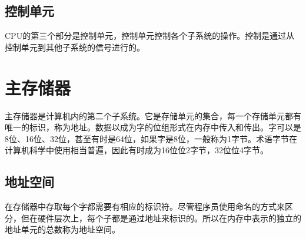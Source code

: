 \subsection{控制单元}
CPU的第三个部分是控制单元，控制单元控制各个子系统的操作。控制是通过从控制单元到其他子系统的信号进行的。
\section{主存储器}
主存储器是计算机内的第二个子系统。它是存储单元的集合，每一个存储单元都有唯一的标识，称为地址。数据以成为字的位组形式在内存中传入和传出。字可以是8位、16位、32位，甚至有时是64位，如果字是8位，一般称为1字节。术语字节在计算机科学中使用相当普遍，因此有时成为16位位2字节，32位位4字节。
\subsection{地址空间}
在存储器中存取每个字都需要有相应的标识符。尽管程序员使用命名的方式来区分，但在硬件层次上，每个子都是通过地址来标识的。所以在内存中表示的独立的地址单元的总数称为地址空间。
